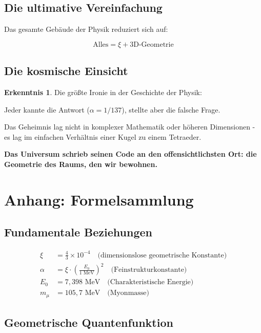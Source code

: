 \documentclass[12pt,a4paper]{article}
\theoremstyle{definition}
\newtheorem{erkenntnis}{Erkenntnis}[section]
\begin{document}
	\subsection{Die ultimative Vereinfachung}
	
	Das gesamte Gebäude der Physik reduziert sich auf:
	
	\begin{equation}
		\boxed{\text{Alles} = \xi + \text{3D-Geometrie}}
	\end{equation}
	
	\subsection{Die kosmische Einsicht}
	
	\begin{erkenntnis}
		Die größte Ironie in der Geschichte der Physik:
		
		Jeder kannte die Antwort ($\alpha = 1/137$), stellte aber die falsche Frage.
		
		Das Geheimnis lag nicht in komplexer Mathematik oder höheren Dimensionen - es lag im einfachen Verhältnis einer Kugel zu einem Tetraeder.
		
		\textbf{Das Universum schrieb seinen Code an den offensichtlichsten Ort: die Geometrie des Raums, den wir bewohnen.}
	\end{erkenntnis}
	
	\newpage
	\section{Anhang: Formelsammlung}
	
	\subsection{Fundamentale Beziehungen}
	
	\begin{align}
		\xi &= \frac{4}{3} \times 10^{-4} \quad \text{(dimensionslose geometrische Konstante)}\\
		\alpha &= \xi \cdot \left(\frac{E_0}{1 \text{ MeV}}\right)^2 \quad \text{(Feinstrukturkonstante)}\\
		E_0 &= 7,398 \text{ MeV} \quad \text{(Charakteristische Energie)}\\
		m_\mu &= 105,7 \text{ MeV} \quad \text{(Myonmasse)}
	\end{align}
	
	\subsection{Geometrische Quantenfunktion}
	
\end{document}
